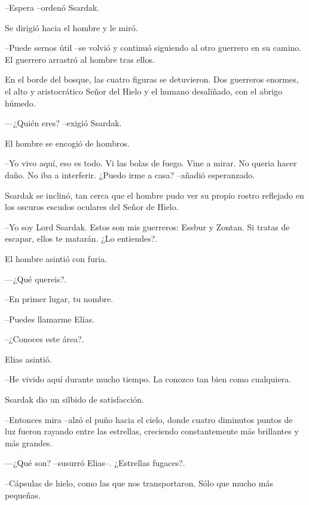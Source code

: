 --Espera --ordenó Ssardak. 


Se dirigió hacia el hombre y le miró. 


--Puede sernos útil --se volvió y continuó siguiendo al otro guerrero en su camino. El guerrero arrastró al hombre tras ellos.



En el borde del bosque, las cuatro figuras se detuvieron. Dos guerreros enormes, el alto y aristocrático Señor del Hielo y el humano desaliñado, con el abrigo húmedo.



—¿Quién eres? --exigió Ssardak.



El hombre se encogió de hombros. 


--Yo vivo aquí, eso es todo. Vi las bolas de fuego. Vine a mirar. No queria hacer daño. No iba a interferir. ¿Puedo irme a casa? --añadió esperanzado.



Ssardak se inclinó, tan cerca que el hombre pudo ver su propio rostro reflejado en los oscuros escudos oculares del Señor de Hielo.


--Yo soy Lord Ssardak. Estos son mis guerreros: Essbur y Zontan. Si tratas de escapar, ellos te matarán. ¿Lo entiendes?.



El hombre asintió con furia. 


—¿Qué quereis?.


--En primer lugar, tu nombre.



--Puedes llamarme Elías. 



--¿Conoces este área?.



Elias asintió. 


--He vivido aquí durante mucho tiempo. La conozco tan bien como cualquiera.



Ssardak dio un silbido de satisfacción. 


--Entonces mira --alzó el puño hacia el cielo, donde cuatro diminutos puntos de luz fueron rayando entre las estrellas, creciendo constantemente más brillantes y más grandes.



—¿Qué son? --susurró Elias--. ¿Estrellas fugaces?.



--Cápsulas de hielo, como las que nos transportaron. Sólo que mucho más pequeñas. 



